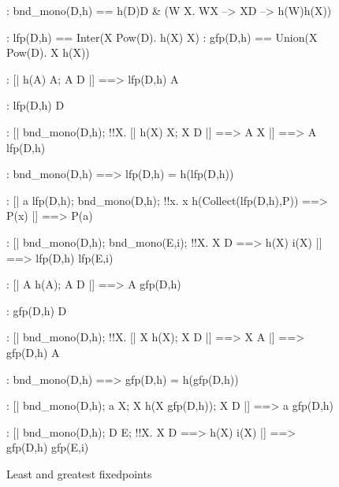 \begin{figure}
\begin{alltt*}\isastyleminor
{}:  bnd_mono(D,h) == 
               h(D)\isasymsubseteq{}D & ({\isasymforall}W X. W\isasymsubseteq{}X --> X\isasymsubseteq{}D --> h(W)\isasymsubseteq{}h(X))

:       lfp(D,h) == Inter({\ttlbrace}X \isasymin Pow(D). h(X) \isasymsubseteq X{\ttrbrace})
:       gfp(D,h) == Union({\ttlbrace}X \isasymin Pow(D). X \isasymsubseteq h(X){\ttrbrace})


: [| h(A) \isasymsubseteq A;  A \isasymsubseteq D |] ==> lfp(D,h) \isasymsubseteq A

:    lfp(D,h) \isasymsubseteq D

:  [| bnd_mono(D,h);  
                  !!X. [| h(X) \isasymsubseteq X;  X \isasymsubseteq D |] ==> A \isasymsubseteq X 
               |] ==> A \isasymsubseteq lfp(D,h)

:    bnd_mono(D,h) ==> lfp(D,h) = h(lfp(D,h))

:        [| a \isasymin lfp(D,h);  bnd_mono(D,h);
                  !!x. x \isasymin h(Collect(lfp(D,h),P)) ==> P(x)
               |] ==> P(a)

:      [| bnd_mono(D,h);  bnd_mono(E,i);
                  !!X. X \isasymsubseteq D ==> h(X) \isasymsubseteq i(X)  
               |] ==> lfp(D,h) \isasymsubseteq lfp(E,i)

: [| A \isasymsubseteq h(A);  A \isasymsubseteq D |] ==> A \isasymsubseteq gfp(D,h)

:    gfp(D,h) \isasymsubseteq D

:     [| bnd_mono(D,h);  
                  !!X. [| X \isasymsubseteq h(X);  X \isasymsubseteq D |] ==> X \isasymsubseteq A
               |] ==> gfp(D,h) \isasymsubseteq A

:    bnd_mono(D,h) ==> gfp(D,h) = h(gfp(D,h))

:      [| bnd_mono(D,h); a \isasymin X; X \isasymsubseteq h(X \isasymunion gfp(D,h)); X \isasymsubseteq D 
               |] ==> a \isasymin gfp(D,h)

:      [| bnd_mono(D,h);  D \isasymsubseteq E;
                  !!X. X \isasymsubseteq D ==> h(X) \isasymsubseteq i(X)  
               |] ==> gfp(D,h) \isasymsubseteq gfp(E,i)
\end{alltt*}
\caption{Least and greatest fixedpoints} \label{zf-fixedpt}
\end{figure}



